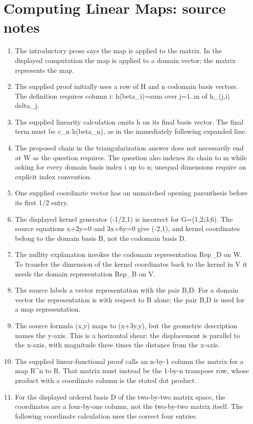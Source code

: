 \section*{Computing Linear Maps: source notes}
\begin{enumerate}
\item The introductory prose says the map is applied to the matrix. In the displayed computation the map is applied to a domain vector; the matrix represents the map.
\item The supplied proof initially uses a row of H and n codomain basis vectors. The definition requires column i: h(beta\_i)=sum over j=1..m of h\_(j,i) delta\_j.
\item The supplied linearity calculation omits h on its final basis vector. The final term must be c\_n h(beta\_n), as in the immediately following expanded line.
\item The proposed chain in the triangularization answer does not necessarily end at W as the question requires. The question also indexes its chain to m while asking for every domain basis index i up to n; unequal dimensions require an explicit index convention.
\item One supplied coordinate vector has an unmatched opening parenthesis before its first 1/2 entry.
\item The displayed kernel generator (-1/2,1) is incorrect for G=(1,2;3,6). The source equations x+2y=0 and 3x+6y=0 give (-2,1), and kernel coordinates belong to the domain basis B, not the codomain basis D.
\item The nullity explanation invokes the codomain representation Rep\_D on W. To transfer the dimension of the kernel coordinates back to the kernel in V it needs the domain representation Rep\_B on V.
\item The source labels a vector representation with the pair B,D. For a domain vector the representation is with respect to B alone; the pair B,D is used for a map representation.
\item The source formula (x,y) maps to (x+3y,y), but the geometric description names the y-axis. This is a horizontal shear: the displacement is parallel to the x-axis, with magnitude three times the distance from the x-axis.
\item The supplied linear-functional proof calls an n-by-1 column the matrix for a map R\textasciicircum{}n to R. That matrix must instead be the 1-by-n transpose row, whose product with a coordinate column is the stated dot product.
\item For the displayed ordered basis D of the two-by-two matrix space, the coordinates are a four-by-one column, not the two-by-two matrix itself. The following coordinate calculation uses the correct four entries.

\end{enumerate}
